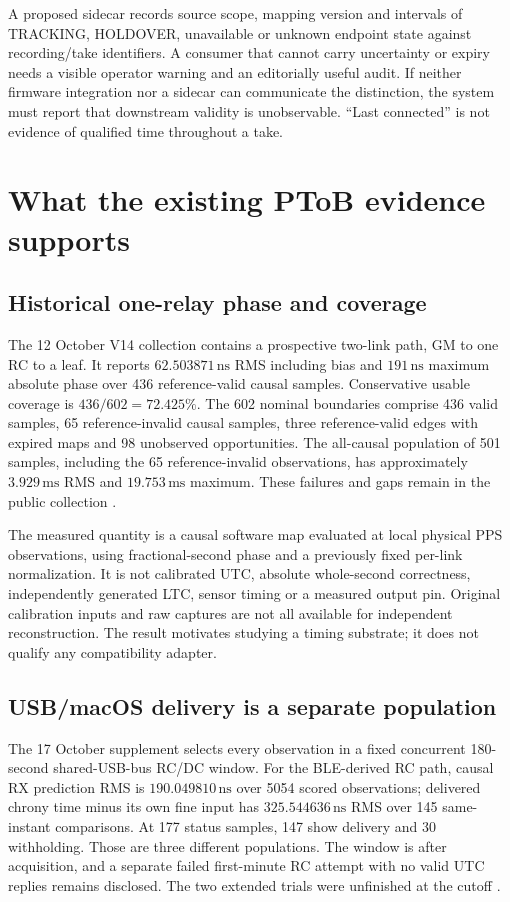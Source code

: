 \documentclass[11pt,letterpaper]{article}
\newcommand{\ns}{\,\mathrm{ns}}\newcommand{\ms}{\,\mathrm{ms}}\newcommand{\ppm}{\,\mathrm{ppm}}
\begin{document}
A proposed sidecar records source scope, mapping version and intervals of TRACKING, HOLDOVER, unavailable or unknown endpoint state against recording/take identifiers. A consumer that cannot carry uncertainty or expiry needs a visible operator warning and an editorially useful audit. If neither firmware integration nor a sidecar can communicate the distinction, the system must report that downstream validity is unobservable. ``Last connected'' is not evidence of qualified time throughout a take.

\section{What the existing PToB evidence supports}\label{sec:evidence}
\subsection{Historical one-relay phase and coverage}
The 12 October V14 collection contains a prospective two-link path, GM to one RC to a leaf. It reports $62.503871\ns$ RMS including bias and $191\ns$ maximum absolute phase over 436 reference-valid causal samples. Conservative usable coverage is $436/602=72.425\%$. The 602 nominal boundaries comprise 436 valid samples, 65 reference-invalid causal samples, three reference-valid edges with expired maps and 98 unobserved opportunities. The all-causal population of 501 samples, including the 65 reference-invalid observations, has approximately $3.929\ms$ RMS and $19.753\ms$ maximum. These failures and gaps remain in the public collection \cite{v14}.

The measured quantity is a causal software map evaluated at local physical PPS observations, using fractional-second phase and a previously fixed per-link normalization. It is not calibrated UTC, absolute whole-second correctness, independently generated LTC, sensor timing or a measured output pin. Original calibration inputs and raw captures are not all available for independent reconstruction. The result motivates studying a timing substrate; it does not qualify any compatibility adapter.

\subsection{USB/macOS delivery is a separate population}
The 17 October supplement selects every observation in a fixed concurrent 180-second shared-USB-bus RC/DC window. For the BLE-derived RC path, causal RX prediction RMS is $190.049810\ns$ over 5054 scored observations; delivered chrony time minus its own fine input has $325.544636\ns$ RMS over 145 same-instant comparisons. At 177 status samples, 147 show delivery and 30 withholding. Those are three different populations. The window is after acquisition, and a separate failed first-minute RC attempt with no valid UTC replies remains disclosed. The two extended trials were unfinished at the cutoff \cite{usb}.
\end{document}
